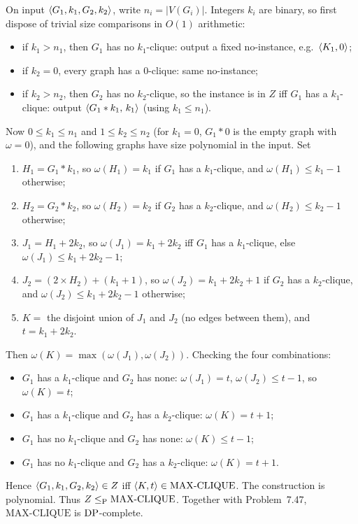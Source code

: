 \begin{soln}
On input $\langle G_1,k_1,G_2,k_2\rangle$, write $n_i=\lvert V(G_i)\rvert$. Integers $k_i$ are binary, so first dispose of trivial size comparisons in $O(1)$ arithmetic:
\begin{itemize}
\item if $k_1>n_1$, then $G_1$ has no $k_1$-clique: output a fixed no-instance, e.g.\ $\langle K_1,0\rangle$;
\item if $k_2=0$, every graph has a $0$-clique: same no-instance;
\item if $k_2>n_2$, then $G_2$ has no $k_2$-clique, so the instance is in $Z$ iff $G_1$ has a $k_1$-clique: output $\langle G_1*k_1,\,k_1\rangle$ (using $k_1\le n_1$).
\end{itemize}
Now $0\le k_1\le n_1$ and $1\le k_2\le n_2$ (for $k_1=0$, $G_1*0$ is the empty graph with $\omega=0$), and the following graphs have size polynomial in the input. Set
\begin{enumerate}
\item $H_1=G_1*k_1$, so $\omega(H_1)=k_1$ if $G_1$ has a $k_1$-clique, and $\omega(H_1)\le k_1-1$ otherwise;
\item $H_2=G_2*k_2$, so $\omega(H_2)=k_2$ if $G_2$ has a $k_2$-clique, and $\omega(H_2)\le k_2-1$ otherwise;
\item $J_1=H_1+2k_2$, so $\omega(J_1)=k_1+2k_2$ iff $G_1$ has a $k_1$-clique, else $\omega(J_1)\le k_1+2k_2-1$;
\item $J_2=(2\times H_2)+(k_1+1)$, so $\omega(J_2)=k_1+2k_2+1$ if $G_2$ has a $k_2$-clique, and $\omega(J_2)\le k_1+2k_2-1$ otherwise;
\item $K=$ the disjoint union of $J_1$ and $J_2$ (no edges between them), and $t=k_1+2k_2$.
\end{enumerate}
Then $\omega(K)=\max(\omega(J_1),\omega(J_2))$. Checking the four combinations:
\begin{itemize}
\item $G_1$ has a $k_1$-clique and $G_2$ has none: $\omega(J_1)=t$, $\omega(J_2)\le t-1$, so $\omega(K)=t$;
\item $G_1$ has a $k_1$-clique and $G_2$ has a $k_2$-clique: $\omega(K)=t+1$;
\item $G_1$ has no $k_1$-clique and $G_2$ has none: $\omega(K)\le t-1$;
\item $G_1$ has no $k_1$-clique and $G_2$ has a $k_2$-clique: $\omega(K)=t+1$.
\end{itemize}
Hence $\langle G_1,k_1,G_2,k_2\rangle\in Z$ iff $\langle K,t\rangle\in\mathrm{MAX\text{-}CLIQUE}$. The construction is polynomial. Thus $Z\le_{\mathrm{P}}\mathrm{MAX\text{-}CLIQUE}$. Together with Problem~7.47, $\mathrm{MAX\text{-}CLIQUE}$ is $\mathrm{DP}$-complete.
\end{soln}

